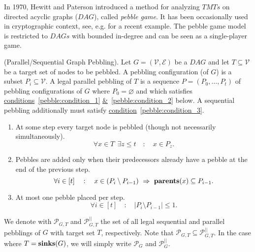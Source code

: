 In 1970, Hewitt and Paterson introduced a method for analyzing $TMTs$ on directed acyclic graphs ($DAG$), called \textit{pebble game}. It has been occasionally used in cryptographic context, see, e.g. \cite{Dziembowski:2011:KSR:2033036.2033061} for a recent example. The pebble game model is restricted to $DAGs$ with bounded in-degree and can be seen as a single-player game.

\begin{definition}{(Parallel/Sequential Graph Pebbling).}\textnormal{\cite{cryptoeprint:2016:875}}
  Let $G=(\mathcal{V},\mathcal{E})$ be a $DAG$ and let $T \subseteq \mathcal{V}$ be a target set of nodes to be pebbled. A pebbling configuration (of $G$) is a subset $P_i \subseteq \mathcal{V}$. A legal parallel pebbling of $T$ is a sequence $P=(P_0,\dots,P_t)$ of pebbling configurations of $G$ where $P_0 = \varnothing$ and which satisfies \hyperref[pebble:condition_1]{conditions}~\ref{pebble:condition_1}
  \hyperref[pebble:condition_2]{\&}~\ref{pebble:condition_2} below. A sequential pebbling additionally must satisfy \hyperref[pebble:condition_3]{condition}~\ref{pebble:condition_3}.

  \begin{enumerate}
    \item \label{pebble:condition_1} At some step every target node is pebbled (though not necessarily simultaneously).
%
    \begin{equation}\label{eqn:pebcondition_1}
      \forall x \in T \ \ \exists z \leq t \quad : \quad x \in P_z.
    \end{equation}
%
    \item \label{pebble:condition_2} Pebbles are added only when their predecessors already have a pebble at the end of the previous step.
%
    \begin{equation}\label{eqn:pebcondition_2}
      \forall i \in [t] \quad : \quad x \in (P_i \setminus P_{i-1}) \ \Rightarrow \ \mbox{\textbf{parents}}(x) \subseteq P_{i-1}.
    \end{equation}
%
    \item \label{pebble:condition_3} At most one pebble placed per step.
%
    \begin{equation}\label{eqn:pebcondition_3}
      \forall i \in [t] \quad : \quad \lvert P_i \setminus P_{i-1} \rvert \leq 1.
    \end{equation}
%
  \end{enumerate}
%
  We denote with $\mathcal{P}_{G,T}$ and $\mathcal{P}_{G,T}^{||}$ the set of all legal sequential and parallel pebblings of $G$ with target set $T$, respectively.
  Note that $\mathcal{P}_{G,T} \subseteq \mathcal{P}_{G,T}^{||}$. In the case where $T=\mbox{\textbf{sinks}}(G)$, we will simply write $\mathcal{P}_{G}$ and
  $\mathcal{P}_{G}^{||}$.
%
\end{definition}
